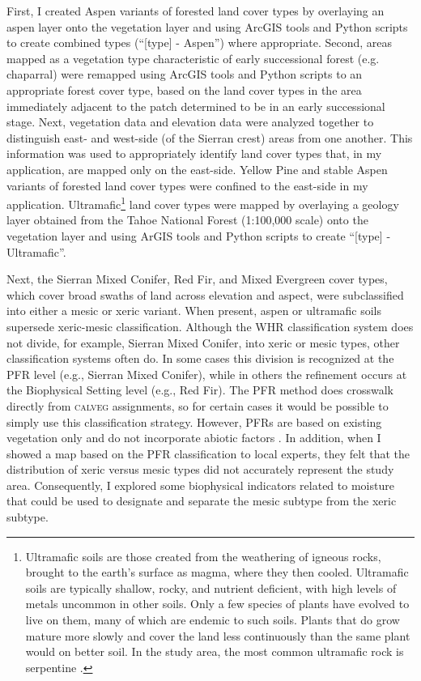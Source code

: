 First, I created Aspen variants of forested land cover types by overlaying an aspen layer onto the vegetation layer and using ArcGIS tools and Python scripts to create combined types (``[type] - Aspen'') where appropriate. Second, areas mapped as a vegetation type characteristic of early successional forest (e.g. chaparral) were remapped using ArcGIS tools and Python scripts to an appropriate forest cover type, based on the land cover types in the area immediately adjacent to the patch determined to be in an early successional stage. Next, vegetation data and elevation data were analyzed together to distinguish east- and west-side (of the Sierran crest) areas from one another. This information was used to appropriately identify land cover types that, in my application, are mapped only on the east-side. Yellow Pine and stable Aspen variants of forested land cover types were confined to the east-side in my application. Ultramafic\footnote{Ultramafic soils are those created from the weathering of igneous rocks, brought to the earth's surface as magma, where they then cooled. Ultramafic soils are typically shallow, rocky, and nutrient deficient, with high levels of metals uncommon in other soils. Only a few species of plants have evolved to live on them, many of which are endemic to such soils. Plants that do grow mature more slowly and cover the land less continuously than the same plant would on better soil. In the study area, the most common ultramafic rock is serpentine \citep{Safford2004}.} land cover types were mapped by overlaying a geology layer obtained from the Tahoe National Forest (1:100,000 scale) onto the vegetation layer and using ArGIS tools and Python scripts to create ``[type] - Ultramafic''. 

Next, the Sierran Mixed Conifer, Red Fir, and Mixed Evergreen cover types, which cover broad swaths of land across elevation and aspect, were subclassified into either a mesic or xeric variant. When present, aspen or ultramafic soils supersede xeric-mesic classification. Although the WHR classification system does not divide, for example, Sierran Mixed Conifer, into xeric or mesic types, other classification systems often do. In some cases this division is recognized at the PFR level (e.g., Sierran Mixed Conifer), while in others the refinement occurs at the Biophysical Setting level (e.g., Red Fir). The PFR method does crosswalk directly from \textsc{calveg} assignments, so for certain cases it would be possible to simply use this classification strategy. However, PFRs are based on existing vegetation only and do not incorporate abiotic factors \citep{Safford2014}. In addition, when I showed a map based on the PFR classification to local experts, they felt that the distribution of xeric versus mesic types did not accurately represent the study area. Consequently, I explored some biophysical indicators related to moisture that could be used to designate and separate the mesic subtype from the xeric subtype.

